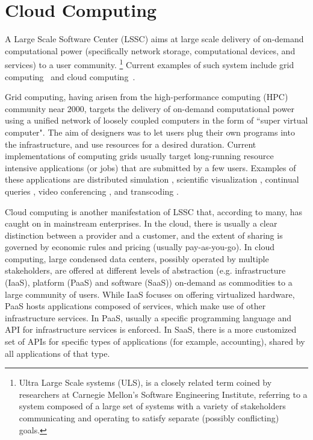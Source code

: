   \section{Cloud Computing}
 A Large Scale Software Center (LSSC) aims at large scale delivery of on-demand computational power (specifically network storage, computational devices, and services) to a user community.   
 \footnote{Ultra Large Scale systems (ULS), is a closely related term coined by researchers at Carnegie Mellon's Software Engineering Institute, referring to a system composed of a large set of systems with a variety of stakeholders communicating and operating to satisfy separate (possibly conflicting) goals.}
Current examples of such system include grid computing~\cite{foster1997globus,foster2002grid} and cloud computing~\cite{BHayesACMComm2008,MArmbrustEtAlTR2009,BRochwergerEtALIBM2009,RBuyyaEtAlFGCS2009}. 
    
Grid computing, having arisen from the high-performance computing (HPC)  community near 2000, targets the delivery of on-demand computational power using a unified network of loosely coupled computers in the form of ``super virtual computer". The aim of designers was to let users plug their own programs into the infrastructure, and use resources for a desired duration. 
Current implementations of computing grids usually target long-running resource intensive applications (or jobs) that are submitted by a few users. Examples of these applications are distributed simulation \cite{ddsos,ddsos2},
scientific visualization \cite{wolf2002smartpointers}, 
continual queries \cite{babu2001continuous,kumar2005resource}, 
video conferencing \cite{huang2003network}, 
and transcoding \cite{radiantGrid}.  

Cloud computing is another manifestation of LSSC  that, according to many, has caught on in mainstream enterprises.
In the cloud, there is usually a clear distinction between a provider and a customer, and the extent of sharing is governed by economic rules and pricing (usually pay-as-you-go). 
In cloud computing, large condensed data centers, possibly operated by multiple stakeholders, are offered at different levels of abstraction (e.g. infrastructure (IaaS), platform (PaaS) and software (SaaS)) on-demand as commodities to a large community of users. While IaaS focuses on offering virtualized hardware, PaaS hosts applications composed of services, which make use of other infrastructure services. In PaaS, usually a specific programming language and API for infrastructure services is enforced. 
In SaaS, there is a more customized set of APIs for specific types of applications (for example, accounting), shared by all applications of that type. 
 

